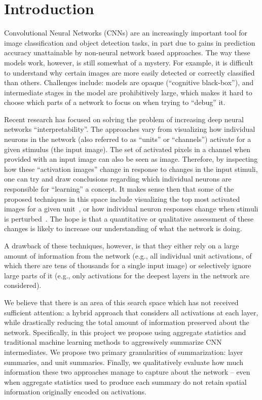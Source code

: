 \section{Introduction}

Convolutional Neural Networks (CNNs) are an increasingly important tool for image classification and object detection tasks, in part due to gains in prediction accuracy unattainable by non-neural network based approaches.  The way these models work, however, is still somewhat of a mystery.  For example, it is difficult to understand why certain images are more easily detected or correctly classified than others.  Challenges include: models are opaque (``cognitive black-box''), and intermediate stages in the model are prohibitively large, which makes it hard to choose which parts of a network to focus on when trying to ``debug'' it.

Recent research has focused on solving the problem of increasing deep neural networks ``interpretability''. The approaches vary from visualizing how individual neurons in the network (also referred to as ``units'' or ``channels'') activate for a given stimulus (the input image). The set of activated pixels in a channel when provided with an input image can also be seen as image.  Therefore, by inspecting how these ``activation images'' change in response to changes in the input stimuli, one can try and draw conclusions regarding which individual neurons are responsible for ``learning'' a concept. It makes sense then that some of the proposed techniques in this space include visualizing the top most activated images for a given unit~\cite{netdissect_2017}, or how individual neuron responses change when stimuli is perturbed~\cite{inverting_2014, intraclass_2015}.  The hope is that a quantitative or qualitative assessment of these changes is likely to increase our understanding of what the network is doing.

A drawback of these techniques, however, is that they either rely on a large amount of information from the network (e.g., all individual unit activations, of which there are tens of thousands for a single input image) or selectively ignore large parts of it (e.g., only activations for the deepest layers in the network are considered).

We believe that there is an area of this search space which has not received sufficient attention: a hybrid approach that considers all activations at each layer, while drastically reducing the total amount of information preserved about the network. Specifically, in this project we propose using aggregate statistics and traditional machine learning methods to aggressively summarize CNN intermediates.  We propose two primary granularities of summarization: layer summaries, and unit summaries.  Finally, we qualitatively evaluate how much information these two approaches manage to capture about the network -- even when aggregate statistics used to produce each summary do not retain spatial information originally encoded on activations.
